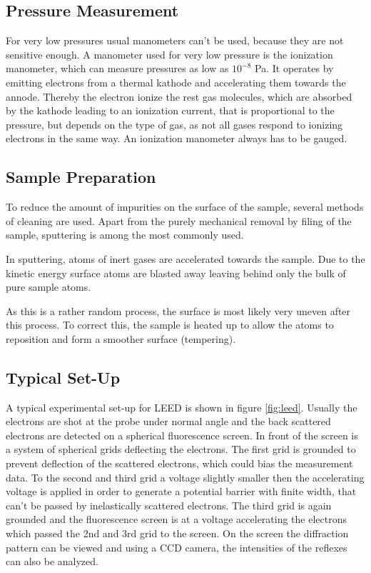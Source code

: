 \documentclass[a4paper]{scrartcl}
\numberwithin{equation}{section}
\numberwithin{figure}{section}
\numberwithin{table}{section}
\begin{document}
\subsection{Pressure Measurement}
For very low pressures usual manometers can't be used, because they are not sensitive enough. A manometer used for very low pressure is the ionization manometer, which can measure pressures as low as $10^{-8}$ Pa. It operates by emitting electrons from a thermal kathode and accelerating them towards the annode. Thereby the electron ionize the rest gas molecules, which are absorbed by the kathode leading to an ionization current, that is proportional to the pressure, but depends on the type of gas, as not all gases respond to ionizing electrons in the same way. An ionization manometer always has to be gauged.

\subsection{Sample Preparation}
To reduce the amount of impurities on the surface of the sample, several methods of cleaning are used. Apart from the purely mechanical removal by filing of the sample, sputtering is among the most commonly used. 

In sputtering, atoms of inert gases are accelerated towards the sample. Due to the kinetic energy surface atoms are blasted away leaving behind only the bulk of pure sample atoms.

As this is a rather random process, the surface is most likely very uneven after this process. To correct this, the sample is heated up to allow the atoms to reposition and form a smoother surface (tempering).

\subsection{Typical Set-Up}
A typical experimental set-up for LEED is shown in figure \ref{fig:leed}. Usually the electrons are shot at the probe under normal angle and the back scattered electrons are detected on a spherical fluorescence screen. In front of the screen is a system of spherical grids deflecting the electrons. The first grid is grounded to prevent deflection of the scattered electrons, which could bias the measurement data. To the second and third grid a voltage slightly smaller then the accelerating voltage is applied in order to generate a potential barrier with finite width, that can't be passed by inelastically scattered electrons. The third grid is again grounded and the fluorescence screen is at a voltage accelerating the electrons which passed the 2nd and 3rd grid to the screen. On the screen the diffraction pattern can be viewed and using a CCD camera, the intensities of the reflexes can also be analyzed.
\end{document}
